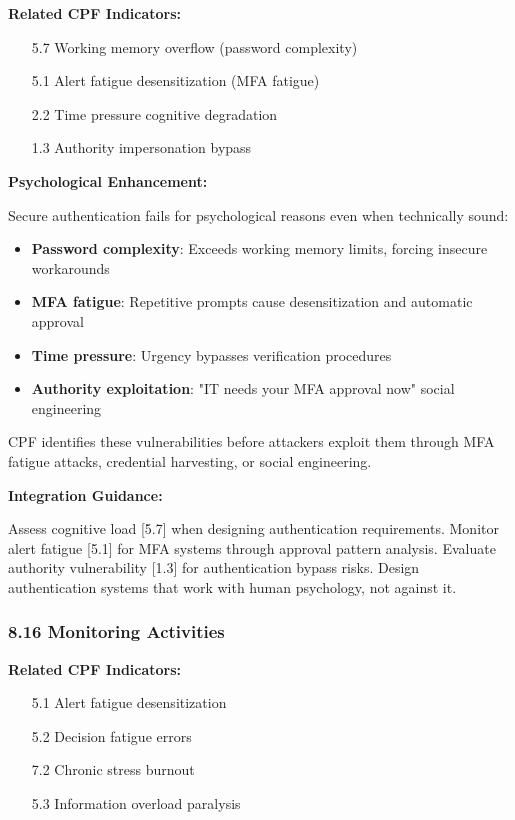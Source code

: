 \documentclass[11pt,a4paper]{article}
\begin{document}
\textbf{Related CPF Indicators:}
\begin{itemize}
\item [5.7] Working memory overflow (password complexity)
\item [5.1] Alert fatigue desensitization (MFA fatigue)
\item [2.2] Time pressure cognitive degradation
\item [1.3] Authority impersonation bypass
\end{itemize}

\textbf{Psychological Enhancement:}

Secure authentication fails for psychological reasons even when technically sound:

\begin{itemize}
\item \textbf{Password complexity}: Exceeds working memory limits, forcing insecure workarounds
\item \textbf{MFA fatigue}: Repetitive prompts cause desensitization and automatic approval
\item \textbf{Time pressure}: Urgency bypasses verification procedures
\item \textbf{Authority exploitation}: "IT needs your MFA approval now" social engineering
\end{itemize}

CPF identifies these vulnerabilities before attackers exploit them through MFA fatigue attacks, credential harvesting, or social engineering.

\textbf{Integration Guidance:}

Assess cognitive load [5.7] when designing authentication requirements. Monitor alert fatigue [5.1] for MFA systems through approval pattern analysis. Evaluate authority vulnerability [1.3] for authentication bypass risks. Design authentication systems that work with human psychology, not against it.

\subsubsection{8.16 Monitoring Activities}

\textbf{Related CPF Indicators:}
\begin{itemize}
\item [5.1] Alert fatigue desensitization
\item [5.2] Decision fatigue errors
\item [7.2] Chronic stress burnout
\item [5.3] Information overload paralysis
\end{itemize}
\end{document}
